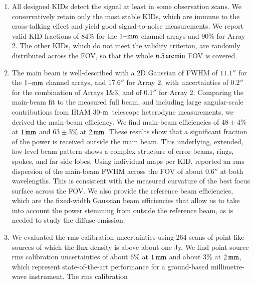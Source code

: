 \documentclass[traditionalabstract]{aa}
\newcommand{\trentemetre}{30-$\rm{m}$}
\newcommand{\lp}[1]{#1}
\newcommand{\rev}[1]{#1}
\begin{document}
{\begin{enumerate}
\item %
  All designed KIDs detect the
  signal at least in some observation
  scans. We conservatively retain only the most stable KIDs, which are
  immune to the cross-talking effect and yield good signal-to-noise
  measurements. 
  We report valid KID fractions of $84\%$
  for the $1\rm{-mm}$ channel arrays and $90\%$ for Array 2. The other
  KIDs, which do not meet the validity criterion, are randomly
  distributed across the FOV, so that the whole $6.5\,\rm{arcmin}$ FOV is
  covered.
  \vspace{1mm}
\item %
  The main beam is well-described with a 2D
  Gaussian of FWHM of $11.1''$ for the $1\rm{-mm}$ channel arrays,
  and $17.6''$ for Array 2, with uncertainties of $0.2''$ for the
  combination of Arrays 1$\&$3, and of $0.1''$ for Array 2.
  {\rev Comparing the main-beam fit to the measured full beam, and 
    including large angular-scale contributions from IRAM
    \trentemetre\ telescope heterodyne measurements, we derived the
  main-beam efficiency.}
  We find main-beam
  efficiencies of {\rev $48 \pm 4 \%$} at $1\,\rm{mm}$ and {\rev $63 \pm 3 \%$} at
  $2\,\rm{mm}$.
  {\lp These results show that a significant fraction of the power is received
    outside the main beam. This underlying,
    extended, low-level beam pattern shows a complex structure of error 
    beams, rings, spokes, {\rev and far side lobes}.}
  Using individual maps per KID, \citet{Adam2018} reported an rms
  dispersion of the main-beam FWHM across the FOV of about $0.6''$ at
  both wavelengths. This is consistent with the measured curvature of
  the best focus surface across the FOV. 
  {\lp We also provide the reference beam efficiencies, which are the
    fixed-width Gaussian beam efficiencies that allow us to take into
    account the power stemming from outside the reference beam, {\rev
      as is needed to study the diffuse emission.}} 
  \vspace{1mm}
\item %
  We evaluated the rms calibration uncertainties using 264 
  scans of {\rev point-like} sources of which the flux density is above about
  one Jy. We find {\rev point-source} rms calibration
  uncertainties of about $6\%$ at $1\,\rm{mm}$ and about $3\%$ at
  $2\,\rm{mm}$, which represent state-of-the-art performance for a
  ground-based millimetre-wave instrument. {\rev The rms calibration
}
\end{enumerate}}
\end{document}
